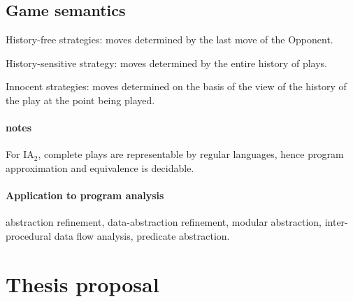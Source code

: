 \documentclass[nocenter]{thesis}
\begin{document}
\chapter{Game semantics}

History-free strategies: moves determined by the last move of the
Opponent.

History-sensitive strategy: moves determined by the entire history
of plays.

Innocent strategies: moves determined on the basis of the view of
the history of the play at the point being played.


\subsection{notes} For IA$_2$, complete plays are representable by
regular languages, hence program approximation and equivalence is
decidable.

\subsection{Application to program analysis}
abstraction refinement, data-abstraction refinement, modular
abstraction, inter-procedural data flow analysis, predicate
abstraction.

\part{Thesis proposal}

\chapter{}
\end{document}
